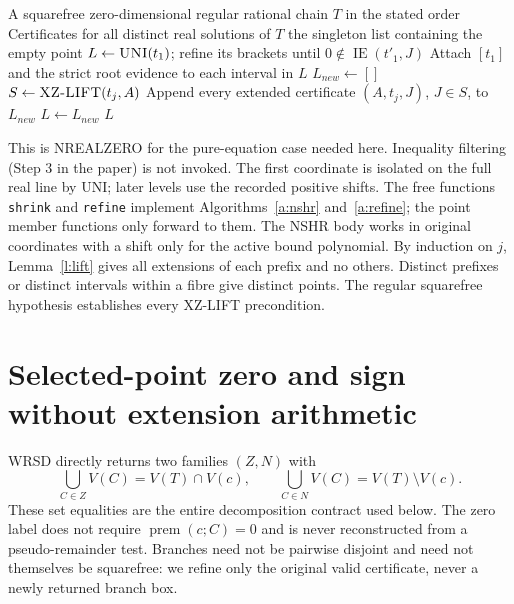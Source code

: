 \documentclass[11pt]{article}
\theoremstyle{definition}
\newcommand{\Eval}{\operatorname{IE}}
\newcommand{\prem}{\operatorname{prem}}
\newcommand{\alg}[1]{\textsc{#1}}
\begin{document}
\begin{algorithm}[H]
\caption{ISOLATE-REGULAR: equation-only NREALZERO driver}\label{a:isolate}
\begin{algorithmic}[1]
\Require A squarefree zero-dimensional regular rational chain $T$ in the stated order
\Ensure Certificates for all distinct real solutions of $T$
 \State \Return the singleton list containing the empty point \EndIf
\State $L\gets\alg{UNI}(t_1)$; refine its brackets until $0\notin\Eval(t'_1,J)$
\State Attach $[t_1]$ and the strict root evidence to each interval in $L$
 \State $L_{new}\gets[]$
  \State $S\gets\alg{XZ-LIFT}(t_j,A)$
  \State Append every extended certificate $(A,t_j,J)$, $J\in S$, to $L_{new}$
 \EndFor
 \State $L\gets L_{new}$
\EndFor
\State \Return $L$
\end{algorithmic}
\end{algorithm}
This is NREALZERO for the pure-equation case needed here. Inequality filtering
(Step 3 in the paper) is not invoked. The first coordinate is isolated on the full
real line by UNI; later levels use the recorded positive shifts. The free functions \texttt{shrink} and \texttt{refine} implement Algorithms~\ref{a:nshr} and~\ref{a:refine};
the point member functions only forward to them. The NSHR body
works in original coordinates with a shift only for the active bound polynomial.
By induction on $j$, Lemma~\ref{l:lift} gives all extensions of each prefix and no
others. Distinct prefixes or distinct intervals within a fibre give distinct points.
The regular squarefree hypothesis establishes every XZ-LIFT precondition.

\section{Selected-point zero and sign without extension arithmetic}
WRSD directly returns two families $(Z,N)$ with
\[\bigcup_{C\in Z}V(C)=V(T)\cap V(c),\qquad
  \bigcup_{C\in N}V(C)=V(T)\setminus V(c).\]
These set equalities are the entire decomposition contract used below.
The zero label does not require $\prem(c;C)=0$ and is never reconstructed
from a pseudo-remainder test.
Branches need not be pairwise disjoint and need not themselves be squarefree:
we refine only the original valid certificate, never a newly returned branch box.
\end{document}
